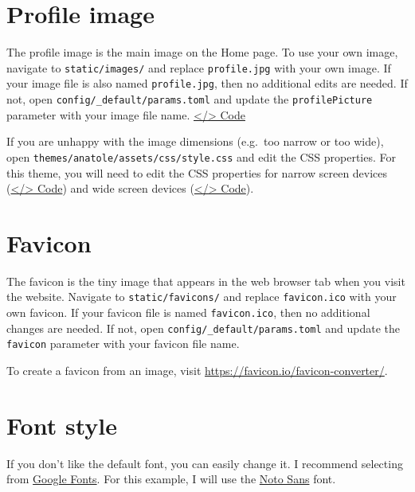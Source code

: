 \documentclass[
]{book}
\begin{document}
\hypertarget{profile-image}{%
\section{Profile image}\label{profile-image}}

The profile image is the main image on the Home page. To use your own image, navigate to \texttt{static/images/} and replace \texttt{profile.jpg} with your own image. If your image file is also named \texttt{profile.jpg}, then no additional edits are needed. If not, open \texttt{config/\_default/params.toml} and update the \texttt{profilePicture} parameter with your image file name. \href{https://github.com/dannymorris/r4sites-anatole-custom/blob/master/config/_default/params.toml\#L6}{\textless/\textgreater{} Code}

If you are unhappy with the image dimensions (e.g.~too narrow or too wide), open \texttt{themes/anatole/assets/css/style.css} and edit the CSS properties. For this theme, you will need to edit the CSS properties for narrow screen devices (\href{https://github.com/dannymorris/r4sites-anatole-custom/blob/master/themes/anatole/assets/css/style.css\#L915-L917}{\textless/\textgreater{} Code}) and wide screen devices (\href{https://github.com/dannymorris/r4sites-anatole-custom/blob/master/themes/anatole/assets/css/style.css\#L293-L296}{\textless/\textgreater{} Code}).

\hypertarget{favicon}{%
\section{Favicon}\label{favicon}}

The favicon is the tiny image that appears in the web browser tab when you visit the website. Navigate to \texttt{static/favicons/} and replace \texttt{favicon.ico} with your own favicon. If your favicon file is named \texttt{favicon.ico}, then no additional changes are needed. If not, open \texttt{config/\_default/params.toml} and update the \texttt{favicon} parameter with your favicon file name.

To create a favicon from an image, visit \url{https://favicon.io/favicon-converter/}.

\hypertarget{font-style}{%
\section{Font style}\label{font-style}}

If you don't like the default font, you can easily change it. I recommend selecting from \href{https://fonts.google.com/}{Google Fonts}. For this example, I will use the \href{https://fonts.google.com/specimen/Noto+Sans?query=noto+sans}{Noto Sans} font.
\end{document}
